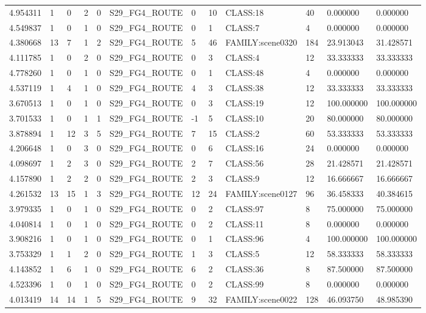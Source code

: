\begin{tabular}{llllllllllll}
4.954311 & 1 & 0 & 2 & 0 & S29\_FG4\_ROUTE & 0 & 10 & CLASS:18 & 40 & 0.000000 & 0.000000 \\
4.549837 & 1 & 0 & 1 & 0 & S29\_FG4\_ROUTE & 0 & 1 & CLASS:7 & 4 & 0.000000 & 0.000000 \\
4.380668 & 13 & 7 & 1 & 2 & S29\_FG4\_ROUTE & 5 & 46 & FAMILY:scene0320 & 184 & 23.913043 & 31.428571 \\
4.111785 & 1 & 0 & 2 & 0 & S29\_FG4\_ROUTE & 0 & 3 & CLASS:4 & 12 & 33.333333 & 33.333333 \\
4.778260 & 1 & 0 & 1 & 0 & S29\_FG4\_ROUTE & 0 & 1 & CLASS:48 & 4 & 0.000000 & 0.000000 \\
4.537119 & 1 & 4 & 1 & 0 & S29\_FG4\_ROUTE & 4 & 3 & CLASS:38 & 12 & 33.333333 & 33.333333 \\
3.670513 & 1 & 0 & 1 & 0 & S29\_FG4\_ROUTE & 0 & 3 & CLASS:19 & 12 & 100.000000 & 100.000000 \\
3.701533 & 1 & 0 & 1 & 1 & S29\_FG4\_ROUTE & -1 & 5 & CLASS:10 & 20 & 80.000000 & 80.000000 \\
3.878894 & 1 & 12 & 3 & 5 & S29\_FG4\_ROUTE & 7 & 15 & CLASS:2 & 60 & 53.333333 & 53.333333 \\
4.206648 & 1 & 0 & 3 & 0 & S29\_FG4\_ROUTE & 0 & 6 & CLASS:16 & 24 & 0.000000 & 0.000000 \\
4.098697 & 1 & 2 & 3 & 0 & S29\_FG4\_ROUTE & 2 & 7 & CLASS:56 & 28 & 21.428571 & 21.428571 \\
4.157890 & 1 & 2 & 2 & 0 & S29\_FG4\_ROUTE & 2 & 3 & CLASS:9 & 12 & 16.666667 & 16.666667 \\
4.261532 & 13 & 15 & 1 & 3 & S29\_FG4\_ROUTE & 12 & 24 & FAMILY:scene0127 & 96 & 36.458333 & 40.384615 \\
3.979335 & 1 & 0 & 1 & 0 & S29\_FG4\_ROUTE & 0 & 2 & CLASS:97 & 8 & 75.000000 & 75.000000 \\
4.040814 & 1 & 0 & 1 & 0 & S29\_FG4\_ROUTE & 0 & 2 & CLASS:11 & 8 & 0.000000 & 0.000000 \\
3.908216 & 1 & 0 & 1 & 0 & S29\_FG4\_ROUTE & 0 & 1 & CLASS:96 & 4 & 100.000000 & 100.000000 \\
3.753329 & 1 & 1 & 2 & 0 & S29\_FG4\_ROUTE & 1 & 3 & CLASS:5 & 12 & 58.333333 & 58.333333 \\
4.143852 & 1 & 6 & 1 & 0 & S29\_FG4\_ROUTE & 6 & 2 & CLASS:36 & 8 & 87.500000 & 87.500000 \\
4.523396 & 1 & 0 & 1 & 0 & S29\_FG4\_ROUTE & 0 & 2 & CLASS:99 & 8 & 0.000000 & 0.000000 \\
4.013419 & 14 & 14 & 1 & 5 & S29\_FG4\_ROUTE & 9 & 32 & FAMILY:scene0022 & 128 & 46.093750 & 48.985390 \\

\end{tabular}
